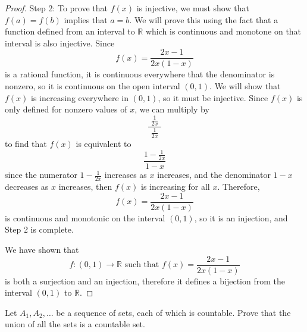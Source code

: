 \documentclass[10pt,letterpaper]{article}
\newcommand{\R}{\mathbb{R}}
\newenvironment{problem}[2][Problem]{\begin{trivlist}
\item[\hskip \labelsep {\bfseries #1}\hskip \labelsep {\bfseries #2.}]}{\end{trivlist}}
\begin{document}
\begin{proof}
\pagebreak
Step 2: To prove that $f(x)$ is injective, we must show that $f(a)=f(b)$ implies that $a=b$. We will prove this using the fact that a function defined from an interval to $\R$ which is continuous and monotone on that interval is also injective. Since 
$$f(x)=\frac{2x-1}{2x(1-x)}$$ 
is a rational function, it is continuous everywhere that the denominator is nonzero, so it is continuous on the open interval $(0,1)$. We will show that $f(x)$ is increasing everywhere in $(0,1)$, so it must be injective. Since $f(x)$ is only defined for nonzero values of $x$, we can multiply by $$\frac{\,\,\frac{1}{2x}\,\,}{\frac{1}{2x}}$$ to find that $f(x)$ is equivalent to 
$$\frac{1-\frac{1}{2x}}{1-x}$$
since the numerator $1-\frac{1}{2x}$ increases as $x$ increases, and the denominator $1-x$ decreases as $x$ increases, then $f(x)$ is increasing for all $x$. Therefore, 
$$f(x)=\frac{2x-1}{2x(1-x)}$$ 
is continuous and monotonic on the interval $(0,1)$, so it is an injection, and Step 2 is complete.

We have shown that 
$$f:(0,1)\rightarrow\R \text{ such that } f(x)=\frac{2x-1}{2x(1-x)}$$
is both a surjection and an injection, therefore it defines a bijection from the interval $(0,1)$ to $\R$.
\end{proof}

\begin{problem}{4.49}
Let $A_1, A_2, \ldots$ be a sequence of sets, each of which is countable. Prove that the union of all the sets is a  countable set. 
\end{problem}
\end{document}
